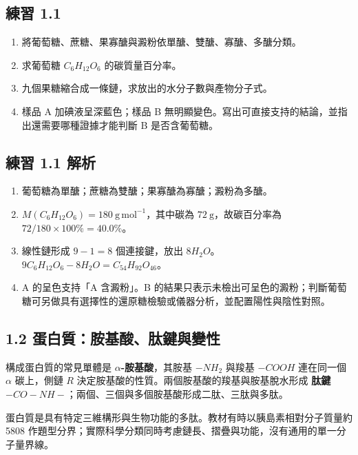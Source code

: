 \documentclass[11pt,a4paper]{article}
\providecommand{\tightlist}{%
  \setlength{\itemsep}{0pt}\setlength{\parskip}{0pt}}
\begin{document}
\subsection{練習 1.1}\label{ux7df4ux7fd2-1.1}

\begin{enumerate}
\def\labelenumi{\arabic{enumi}.}
\tightlist
\item
  將葡萄糖、蔗糖、果寡醣與澱粉依單醣、雙醣、寡醣、多醣分類。
\item
  求葡萄糖 \(C_6H_{12}O_6\) 的碳質量百分率。
\item
  九個果糖縮合成一條鏈，求放出的水分子數與產物分子式。
\item
  樣品 A 加碘液呈深藍色；樣品 B 無明顯變色。寫出可直接支持的結論，並指出還需要哪種證據才能判斷 B 是否含葡萄糖。
\end{enumerate}

\subsection{練習 1.1 解析}\label{ux7df4ux7fd2-1.1-ux89e3ux6790}

\begin{enumerate}
\def\labelenumi{\arabic{enumi}.}
\tightlist
\item
  葡萄糖為單醣；蔗糖為雙醣；果寡醣為寡醣；澱粉為多醣。
\item
  \(M(C_6H_{12}O_6)=180\ \mathrm{g\,mol^{-1}}\)，其中碳為 \(72\ \mathrm g\)，故碳百分率為 \(72/180\times100\%=40.0\%\)。
\item
  線性鏈形成 \(9-1=8\) 個連接鍵，放出 \(8H_2O\)。\(9C_6H_{12}O_6-8H_2O=C_{54}H_{92}O_{46}\)。
\item
  A 的呈色支持「A 含澱粉」。B 的結果只表示未檢出可呈色的澱粉；判斷葡萄糖可另做具有選擇性的還原糖檢驗或儀器分析，並配置陽性與陰性對照。
\end{enumerate}

\subsection{1.2 蛋白質：胺基酸、肽鍵與變性}\label{ux86cbux767dux8ceaux80faux57faux9178ux80bdux9375ux8207ux8b8aux6027}

構成蛋白質的常見單體是 \textbf{\(\alpha\)-胺基酸}，其胺基 \(-NH_2\) 與羧基 \(-COOH\) 連在同一個 \(\alpha\) 碳上，側鏈 \(R\) 決定胺基酸的性質。兩個胺基酸的羧基與胺基脫水形成 \textbf{肽鍵} \(-CO-NH-\)；兩個、三個與多個胺基酸形成二肽、三肽與多肽。

蛋白質是具有特定三維構形與生物功能的多肽。教材有時以胰島素相對分子質量約 5808 作題型分界；實際科學分類同時考慮鏈長、摺疊與功能，沒有通用的單一分子量界線。
\end{document}
